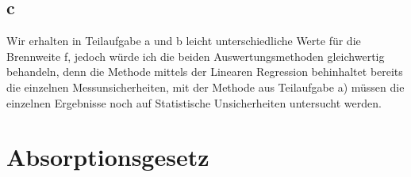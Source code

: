 \subsection{c}
Wir erhalten in Teilaufgabe a und b leicht unterschiedliche Werte für die Brennweite f, jedoch würde ich die beiden Auswertungsmethoden
gleichwertig behandeln, denn die Methode mittels der Linearen Regression behinhaltet bereits die einzelnen Messunsicherheiten, mit der 
Methode aus Teilaufgabe a) müssen die einzelnen Ergebnisse noch auf Statistische Unsicherheiten untersucht werden.
\newpage

 

\section{Absorptionsgesetz}
    

\printbibliography{}


